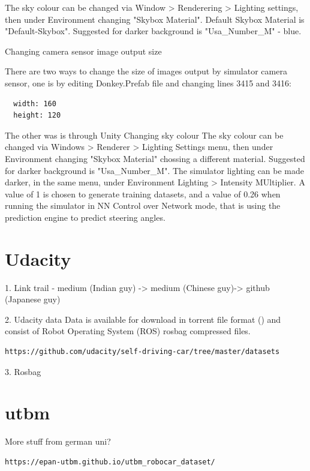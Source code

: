 The sky colour can be changed via Window > Renderering > Lighting settings, then under Environment changing "Skybox Material". Default Skybox Material is "Default-Skybox". Suggested for darker background is "Usa\_Number\_M" - blue.

Changing camera sensor image output size

There are two ways to change the size of images output by simulator camera sensor, one is by editing Donkey.Prefab file and changing lines 3415 and 3416:
\begin{verbatim}
  width: 160
  height: 120
\end{verbatim}
The other was is through Unity
Changing sky colour
The sky colour can be changed via Windows > Renderer > Lighting Settings menu, then under Environment changing "Skybox Material" chossing a different material.  Suggested for darker background is "Usa\_Number\_M".
The simulator lighting can be made darker, in the same menu, under Environment Lighting > Intensity MUltiplier. A value of 1 is chosen to generate training datasets, and a value of 0.26 when running the simulator in NN Control over Network mode, that is using the prediction engine to predict steering angles.
\section{Udacity}

1. Link trail - medium (Indian guy) -> medium (Chinese guy)-> github (Japanese guy)  
  
2. Udacity data  
Data is available for download in torrent file format (\cite{torrentCite}) and consist of Robot Operating System (ROS) rosbag compressed files.

\begin{verbatim}
https://github.com/udacity/self-driving-car/tree/master/datasets
\end{verbatim}
3. Rosbag

\section{utbm}
More stuff from german uni?
\begin{verbatim}
https://epan-utbm.github.io/utbm_robocar_dataset/
\end{verbatim}

